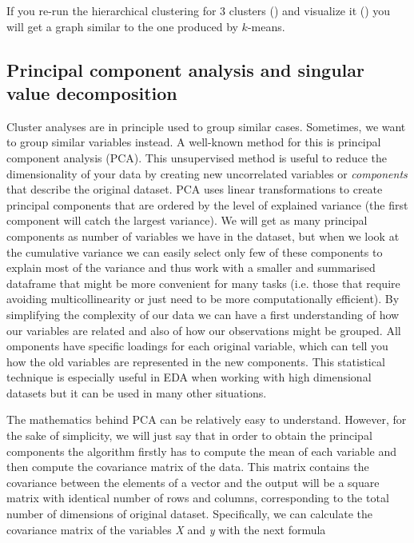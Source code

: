
If you re-run the hierarchical clustering for 3 clusters () and visualize it () you will get a graph similar to the one produced by $k$-means.




\subsection{Principal component analysis and singular value decomposition}

Cluster analyses are in principle used to group similar
cases. Sometimes, we want to group similar variables instead.  A
well-known method for this is principal component analysis (PCA). This
unsupervised method is useful to reduce the dimensionality of your
data by creating new uncorrelated variables or \textit{components}
that describe the original dataset. PCA uses linear transformations to
create principal components that are ordered by the level of explained
variance (the first component will catch the largest variance). We
will get as many principal components as number of variables we have
in the dataset, but when we look at the cumulative variance we can
easily select only few of these components to explain most of the
variance and thus work with a smaller and summarised dataframe that
might be more convenient for many tasks (i.e. those that require
avoiding multicollinearity or just need to be more computationally
efficient). By simplifying the complexity of our data we can have a
first understanding of how our variables are related and also of how
our observations might be grouped. All omponents have specific loadings
for each original variable, which can tell you how the old variables
are represented in the new components. This statistical technique is
especially useful in EDA when working with high dimensional datasets
but it can be used in many other situations.

The mathematics behind PCA can be relatively easy to
understand. However, for the sake of simplicity, we will just say that
in order to obtain the principal components the algorithm firstly has
to compute the mean of each variable and then compute the covariance
matrix of the data. This matrix contains the covariance between the
elements of a vector and the output will be a square matrix with
identical number of rows and columns, corresponding to the total
number of dimensions of original dataset. Specifically, we can
calculate the covariance matrix of the variables \emph{X} and \emph{y}
with the next formula

